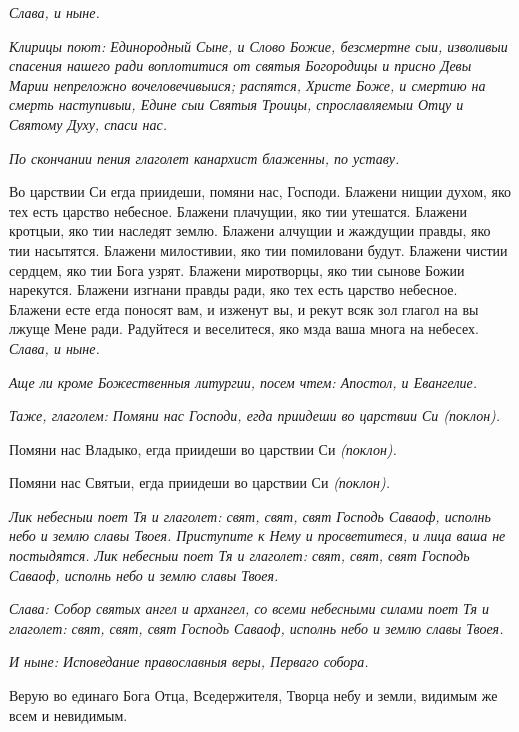  \itshape Слава, и ныне.\normalfont{}


 \itshape Клирицы поют:\normalfont{} Единородный Сыне, и Слово Божие, безсмертне сыи,
изволивыи спасения нашего ради воплотитися от святыя Богородицы и
присно Девы Марии непреложно вочеловечивыися; распятся, Христе Боже, и
смертию на смерть наступивыи, Едине сыи Святыя Троицы, спрославляемыи
Отцу и Святому Духу, спаси нас.


 \itshape По скончании пения глаголет канархист блаженны, по уставу.\normalfont{}


   Во царствии Си егда приидеши, помяни нас, Господи. Блажени нищии
духом, яко тех есть царство небесное. Блажени плачущии, яко тии утешатся.
Блажени кротцыи, яко тии наследят землю. Блажени алчущии и
жаждущии правды, яко тии насытятся. Блажени милостивии, яко тии
помиловани будут. Блажени чистии сердцем, яко тии Бога узрят. Блажени
миротворцы, яко тии сынове Божии нарекутся. Блажени изгнани
правды ради, яко тех есть царство небесное. Блажени есте егда поносят
вам, и изженут вы, и рекут всяк зол глагол на вы лжуще Мене ради.
Радуйтеся и веселитеся, яко мзда ваша многа на небесех. \itshape Слава, и
ныне\normalfont{}.


 \itshape Аще ли кроме Божественныя литургии, посем чтем:\normalfont{} Апостол, и
Евангелие.


 \itshape Таже, глаголем:\normalfont{} Помяни нас Господи, егда приидеши во царствии Си
\itshape (поклон)\normalfont{}.


   Помяни нас Владыко, егда приидеши во царствии Си \itshape (поклон)\normalfont{}.



   Помяни нас Святыи, егда приидеши во царствии Си \itshape (поклон)\normalfont{}.


 \itshape Лик небесныи поет Тя и глаголет:\normalfont{} свят, свят, свят Господь Саваоф,
исполнь небо и землю славы Твоея. Приступите к Нему и просветитеся, и
лица ваша не постыдятся. \itshape Лик небесныи поет\normalfont{} Тя и глаголет: свят, свят, свят
Господь Саваоф, исполнь небо и землю славы Твоея.


 \itshape Слава:\normalfont{} Собор святых ангел и архангел, со всеми небесными силами поет
Тя и глаголет: свят, свят, свят Господь Саваоф, исполнь небо и землю славы
Твоея.


 \itshape И ныне: Исповедание православныя веры, Перваго собора.\normalfont{}


   Верую во единаго Бога Отца, Вседержителя, Творца небу и земли,
видимым же всем и невидимым.


